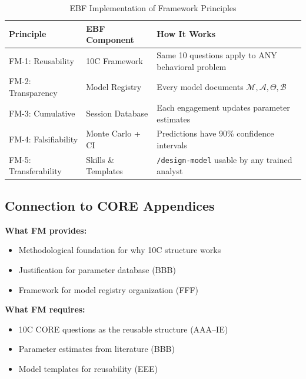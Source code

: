 \begin{table}[htbp]
\centering
\caption{EBF Implementation of Framework Principles}
\label{tab:fm-ebf-implementation}
\renewcommand{\arraystretch}{1.4}
\begin{tabular}{@{}p{3cm}p{4cm}p{6cm}@{}}
\toprule
\textbf{Principle} & \textbf{EBF Component} & \textbf{How It Works} \\
\midrule
FM-1: Reusability & 10C Framework & Same 10 questions apply to ANY behavioral problem \\
FM-2: Transparency & Model Registry & Every model documents $\mathcal{M}, \mathcal{A}, \Theta, \mathcal{B}$ \\
FM-3: Cumulative & Session Database & Each engagement updates parameter estimates \\
FM-4: Falsifiability & Monte Carlo + CI & Predictions have 90\% confidence intervals \\
FM-5: Transferability & Skills \& Templates & \texttt{/design-model} usable by any trained analyst \\
\bottomrule
\end{tabular}
\end{table}

\subsection{Connection to CORE Appendices}

\begin{tcolorbox}[colback=yellow!5!white, colframe=yellow!75!black,
    title=Integration: FM $\leftrightarrow$ CORE Appendices]
\textbf{What FM provides:}
\begin{itemize}[nosep]
\item Methodological foundation for why 10C structure works
\item Justification for parameter database (BBB)
\item Framework for model registry organization (FFF)
\end{itemize}

\textbf{What FM requires:}
\begin{itemize}[nosep]
\item 10C CORE questions as the reusable structure (AAA--IE)
\item Parameter estimates from literature (BBB)
\item Model templates for reusability (EEE)
\end{itemize}
\end{tcolorbox}

